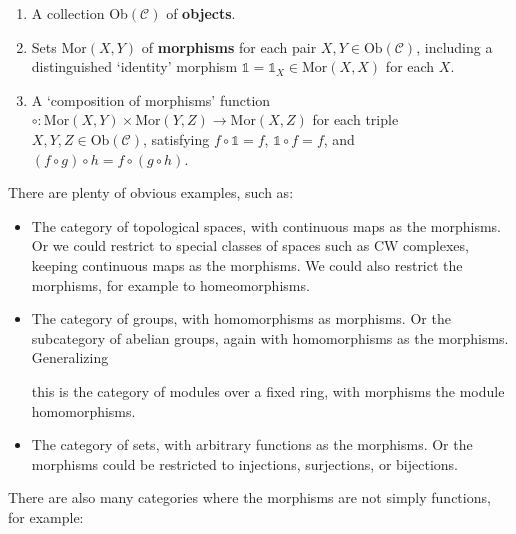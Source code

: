 \begin{enumerate}
\item A collection Ob$(\mathcal{C})$ of \textbf{objects}.
\item Sets Mor$(X, Y)$ of \textbf{morphisms} for each pair $X, Y \in \text{Ob}(\mathcal{C})$, including a distinguished `identity' morphism $\mathbb{1} = \mathbb{1}_X \in \text{Mor}(X, X)$ for each $X$.
\item A `composition of morphisms' function $\circ : \text{Mor}(X, Y) \times \text{Mor}(Y, Z) \to \text{Mor}(X, Z)$ for each triple $X, Y, Z \in \text{Ob}(\mathcal{C})$, satisfying $f \circ \mathbb{1} = f$, $\mathbb{1} \circ f = f$, and $(f \circ g) \circ h = f \circ (g \circ h)$.
\end{enumerate}

There are plenty of obvious examples, such as:

\begin{itemize}
\item The category of topological spaces, with continuous maps as the morphisms. Or
we could restrict to special classes of spaces such as CW complexes, keeping
continuous maps as the morphisms. We could also restrict the morphisms, for
example to homeomorphisms.
\item The category of groups, with homomorphisms as morphisms. Or the subcategory
of abelian groups, again with homomorphisms as the morphisms. Generalizing

this is the category of modules over a fixed ring, with morphisms the module homomorphisms.


\item The category of sets, with arbitrary functions as the morphisms. Or the morphisms could be restricted to injections, surjections, or bijections.
\end{itemize}

There are also many categories where the morphisms are not simply functions, for example:

